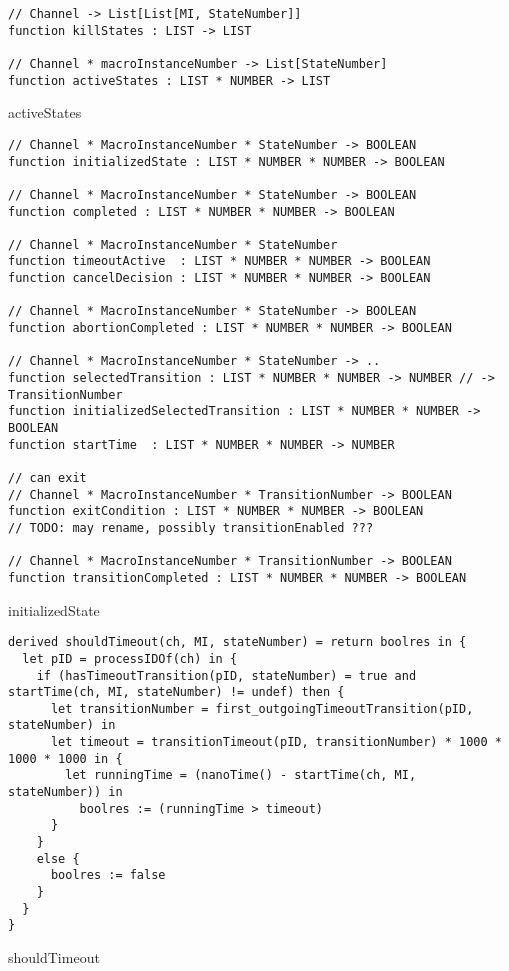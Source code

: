 \begin{listing}[H]
\begin{verbatim}
// Channel -> List[List[MI, StateNumber]]
function killStates : LIST -> LIST

// Channel * macroInstanceNumber -> List[StateNumber]
function activeStates : LIST * NUMBER -> LIST
\end{verbatim}
\caption{activeStates}
\label{lst:asm:activeStates}
\end{listing}



\begin{listing}[H]
\begin{verbatim}
// Channel * MacroInstanceNumber * StateNumber -> BOOLEAN
function initializedState : LIST * NUMBER * NUMBER -> BOOLEAN

// Channel * MacroInstanceNumber * StateNumber -> BOOLEAN
function completed : LIST * NUMBER * NUMBER -> BOOLEAN

// Channel * MacroInstanceNumber * StateNumber
function timeoutActive  : LIST * NUMBER * NUMBER -> BOOLEAN
function cancelDecision : LIST * NUMBER * NUMBER -> BOOLEAN

// Channel * MacroInstanceNumber * StateNumber -> BOOLEAN
function abortionCompleted : LIST * NUMBER * NUMBER -> BOOLEAN

// Channel * MacroInstanceNumber * StateNumber -> ..
function selectedTransition : LIST * NUMBER * NUMBER -> NUMBER // -> TransitionNumber
function initializedSelectedTransition : LIST * NUMBER * NUMBER -> BOOLEAN
function startTime  : LIST * NUMBER * NUMBER -> NUMBER

// can exit
// Channel * MacroInstanceNumber * TransitionNumber -> BOOLEAN
function exitCondition : LIST * NUMBER * NUMBER -> BOOLEAN
// TODO: may rename, possibly transitionEnabled ???

// Channel * MacroInstanceNumber * TransitionNumber -> BOOLEAN
function transitionCompleted : LIST * NUMBER * NUMBER -> BOOLEAN
\end{verbatim}
\caption{initializedState}
\label{lst:asm:initializedState}
\end{listing}



\begin{listing}[H]
\begin{verbatim}
derived shouldTimeout(ch, MI, stateNumber) = return boolres in {
  let pID = processIDOf(ch) in {
    if (hasTimeoutTransition(pID, stateNumber) = true and startTime(ch, MI, stateNumber) != undef) then {
      let transitionNumber = first_outgoingTimeoutTransition(pID, stateNumber) in
      let timeout = transitionTimeout(pID, transitionNumber) * 1000 * 1000 * 1000 in {
        let runningTime = (nanoTime() - startTime(ch, MI, stateNumber)) in
          boolres := (runningTime > timeout)
      }
    }
    else {
      boolres := false
    }
  }
}
\end{verbatim}
\caption{shouldTimeout}
\label{lst:asm:shouldTimeout}
\end{listing}


